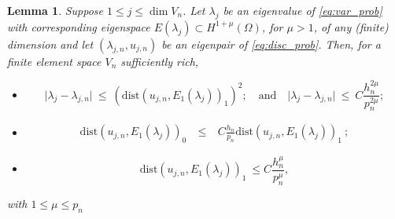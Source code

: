 \documentclass[preprint,12pt]{elsarticle}
\newtheorem{lemma}[theorem]{Lemma}
\begin{document}
\begin{lemma}
\label{lm:adj}
Suppose  $ 1 \leq j\leq \dim V_n$. Let
$\lambda_j$ be an eigenvalue   of \eqref{eq:var_prob} with
corresponding eigenspace $E(\lambda_j)\subset H^{1+\mu}(\Omega)$, for $\mu>1$, of any (finite) dimension  and
let $(\lambda_{j,n},u_{j,n})$ be an  eigenpair  of \eqref{eq:disc_prob}.
Then, for a finite element space $V_n$ sufficiently rich,
\begin{itemize}
\item[(i)] 
\begin{equation}
\vert \lambda_j - \lambda_{j,n} \vert \ \leq \ (\mathrm{dist}(
u_{j,n},E_1(\lambda_j))_{1})^2; \quad \text{and} \quad
\vert \lambda_j - \lambda_{j,n} \vert \ \leq \ C
\frac{h_n^{2\mu} }{p_n^{2\mu}};  \label{eq:supereig}
\end{equation}
\item[(ii)] 
\begin{eqnarray}
\mathrm{dist}(
u_{j,n},E_1(\lambda_j))_{0}\ & \leq& \ C \frac{h_n}{p_n}
 \mathrm{dist}(
u_{j,n},E_1(\lambda_j))_{1} \ ; \label{eq:adj}
\end{eqnarray}
\item[(iii)]
\begin{equation}
\label{eq:energy} \mathrm{dist}(
u_{j,n},E_1(\lambda_j))_{1} \ \leq
C \frac{h_n^{\mu}}{p_n^{\mu}}, 
\end{equation}
\end{itemize}
with $1\leq \mu\leq p_n$
\end{lemma}

\end{document}
